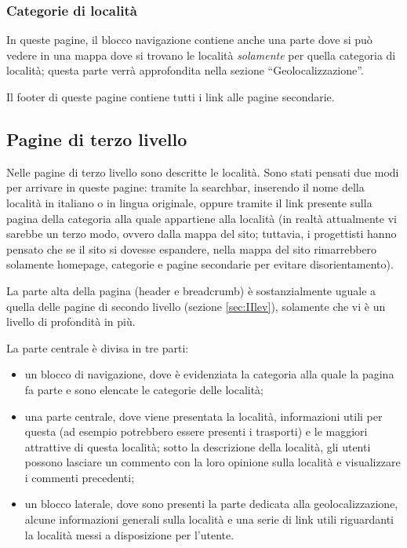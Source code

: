 \subsubsection{Categorie di località}\label{sec:categorieStruct}
In queste pagine, il blocco navigazione contiene anche una parte dove si può vedere in una mappa dove si trovano le località \textit{solamente} per quella categoria di località; questa parte verrà approfondita nella sezione ``Geolocalizzazione''.

Il footer di queste pagine contiene tutti i link alle pagine secondarie.

\subsection{Pagine di terzo livello}\label{sec:struttLoc}
Nelle pagine di terzo livello sono descritte le località. Sono stati pensati due modi per arrivare in queste pagine: tramite la searchbar, inserendo il nome della località in italiano o in lingua originale, oppure tramite il link presente sulla pagina della categoria alla quale appartiene alla località (in realtà attualmente vi sarebbe un terzo modo, ovvero dalla mappa del sito; tuttavia, i progettisti hanno pensato che se il sito si dovesse espandere, nella mappa del sito rimarrebbero solamente homepage, categorie e pagine secondarie per evitare disorientamento).

La parte alta della pagina (header e breadcrumb) è sostanzialmente uguale a quella delle pagine di secondo livello (sezione \ref{sec:IIlev}), solamente che vi è un livello di profondità in più.

La parte centrale è divisa in tre parti:
\begin{itemize}
\item un blocco di navigazione, dove è evidenziata la categoria alla quale la pagina fa parte e sono elencate le categorie delle località;
\item una parte centrale, dove viene presentata la località, informazioni utili per questa (ad esempio potrebbero essere presenti i trasporti) e le maggiori attrattive di questa località; sotto la descrizione della località, gli utenti possono lasciare un commento con la loro opinione sulla località e visualizzare i commenti precedenti;
\item un blocco laterale, dove sono presenti la parte dedicata alla geolocalizzazione, alcune informazioni generali sulla località e una serie di link utili riguardanti la località messi a disposizione per l'utente.
\end{itemize}

